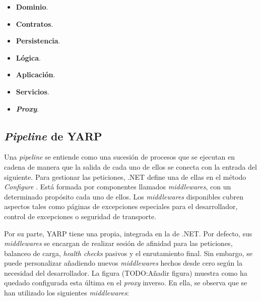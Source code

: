\documentclass[11pt,spanish,listoffigures]{tfgetsinf}
\begin{document}
\begin{itemize}

	\item \textbf{Dominio}.

	\item \textbf{Contratos}.

	\item \textbf{Persistencia}.

	\item \textbf{Lógica}.

	\item \textbf{Aplicación}.

	\item \textbf{Servicios}.

	\item \textbf{\emph{Proxy}}.

\end{itemize}


		\subsection{\emph{Pipeline} de YARP}

Una \emph{pipeline} se entiende como una sucesión de procesos que se ejecutan en cadena de manera que la salida de cada uno de ellos se conecta con la entrada del siguiente. Para gestionar las peticiones, .NET define una de ellas en el método \emph{Configure} \cite{MiddlewaresPipeline}. Está formada por componentes llamados \emph{middlewares}, con un determinado propósito cada uno de ellos. Los \emph{middlewares} disponibles cubren aspectos tales como páginas de excepciones especiales para el desarrollador, control de excepciones o seguridad de transporte.

Por su parte, YARP tiene una propia, integrada en la de .NET. Por defecto, sus \emph{middlewares} se encargan de realizar sesión de afinidad para las peticiones, balanceo de carga, \emph{health checks} pasivos y el enrutamiento final. Sin embargo, se puede personalizar añadiendo nuevos \emph{middlewares} hechos desde cero según la necesidad del desarrollador. La figura (TODO:Añadir figura) muestra como ha quedado configurada esta última en el \emph{proxy} inverso. En ella, se observa que se han utilizado los siguientes \emph{middlewares}:

\end{document}
